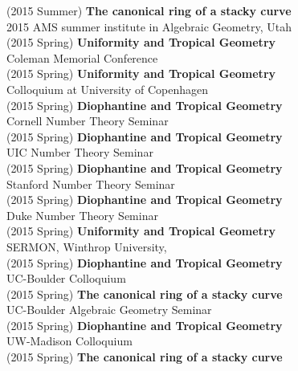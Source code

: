 \documentclass[margin,line]{res}
\begin{document}
\begin{resume}
(2015 Summer) \textbf{The canonical ring of a stacky curve}\\  
2015 AMS summer institute in Algebraic Geometry, Utah
\vspace{.05cm}\\
(2015 Spring) \textbf{Uniformity and Tropical Geometry}\\
Coleman Memorial Conference
\vspace{.05cm}\\
(2015 Spring) \textbf{Uniformity and Tropical Geometry}\\
Colloquium at University of Copenhagen
\vspace{.05cm}\\
(2015 Spring) \textbf{Diophantine and Tropical Geometry}\\
Cornell Number Theory Seminar
\vspace{.05cm}\\
(2015 Spring) \textbf{Diophantine and Tropical Geometry}\\
UIC Number Theory Seminar
\vspace{.05cm}\\
(2015 Spring) \textbf{Diophantine and Tropical Geometry}\\
Stanford Number Theory Seminar
\vspace{.05cm}\\
(2015 Spring) \textbf{Diophantine and Tropical Geometry}\\
Duke Number Theory Seminar
\vspace{.05cm}\\
(2015 Spring) \textbf{Uniformity and Tropical Geometry}\\
SERMON, Winthrop University, 
\vspace{.05cm}\\
(2015 Spring) \textbf{Diophantine and Tropical Geometry}\\
UC-Boulder Colloquium
\vspace{.05cm}\\
(2015 Spring) \textbf{The canonical ring of a stacky curve}\\  
UC-Boulder Algebraic Geometry Seminar
\vspace{.05cm}\\
(2015 Spring) \textbf{Diophantine and Tropical Geometry}\\
UW-Madison Colloquium
\vspace{.05cm}\\
(2015 Spring) \textbf{The canonical ring of a stacky curve}\\  

\end{resume}
\end{document}
